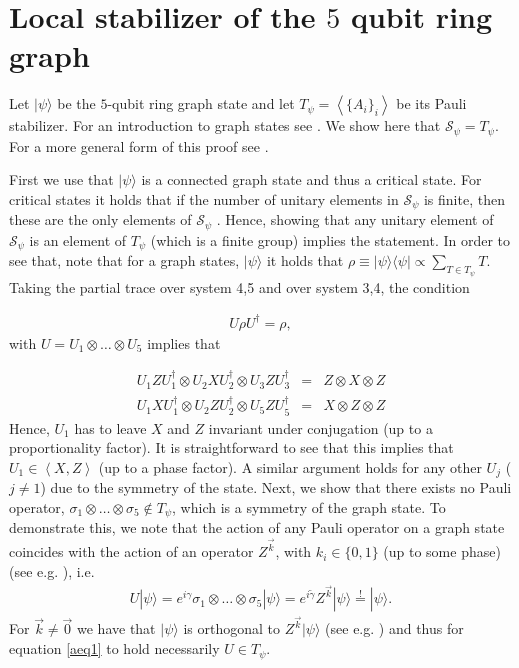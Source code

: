 \documentclass[superscriptaddress,twocolumn]{revtex4}\usepackage[utf8]{inputenc}
\newcommand{\bra}[1]{\langle #1|}
\newcommand{\ket}[1]{|#1\rangle}
\newcommand{\bea}{\begin{eqnarray}}
\newcommand{\eea}{\end{eqnarray}}
\begin{document}
\appendix

\section{Local stabilizer of the $5$ qubit ring graph\label{Appendix A}}

Let $\ket{\psi}$ be the $5$-qubit ring graph state and let $T_\psi=\left<\{A_i\}_i\right>$ be its Pauli stabilizer. For an introduction to graph states see \cite{HeDu06}. We show here that $\mathcal{S}_\psi=T_\psi$. For a more general form of this proof see \cite{RaDa18}.

First we use that $\ket{\psi}$ is a connected graph state and thus a critical state. For critical states it holds that if the number of unitary elements in  $\mathcal{S}_\psi$ is finite, then these are the only elements of $\mathcal{S}_\psi$ \cite{WaNo17}. Hence, showing that any unitary element of $\mathcal{S}_\psi$ is an element of $T_\psi$ (which is a finite group) implies the statement.
In order to see that, note that for a graph states, $\ket{\psi}$ it holds that  $\rho \equiv \ket{\psi}\bra{\psi}\propto\sum_{T\in T_{\psi}}T$. Taking the partial trace over system 4,5 and over system 3,4, the condition

\bea
U\rho U^\dagger=\rho,
\label{eq:sym}
\eea
with $U=U_1\otimes \ldots \otimes U_5$ implies that

\bea
U_1ZU_1^\dagger\otimes U_2XU_2^\dagger\otimes U_3ZU_3^\dagger&=&Z\otimes X\otimes Z\\
U_1XU_1^\dagger\otimes U_2ZU_2^\dagger\otimes U_5ZU_5^\dagger&=&X\otimes Z\otimes Z
\eea
Hence, $U_1$ has to leave $X$ and $Z$ invariant under conjugation (up to a proportionality factor). It is straightforward to see that this implies that $U_1\in \left<X,Z\right>$ (up to a phase factor). A similar argument holds for any other $U_j$ ($j\neq 1$) due to the symmetry of the state. Next, we show that there exists no Pauli operator, $\sigma_1\otimes \ldots\otimes \sigma_5 \notin T_\psi$, which is a symmetry of the graph state. To demonstrate this, we note that the action of any Pauli operator on a graph state coincides with the action of an operator $Z^{\vec{k}}$, with $k_i\in \{0,1\}$  (up to some phase) (see e.g. \cite{HeDu06}), i.e.
\bea
U\ket{\psi}=e^{i\gamma}\sigma_1\otimes \ldots\otimes \sigma_5 \ket{\psi}=e^{i\tilde{\gamma}}Z^{\vec{k}}\ket{\psi}\overset{!}{=} \ket{\psi}.\label{aeq1}
\eea
For $\vec{k} \neq \vec{0}$ we have that $\ket{\psi}$ is orthogonal to $Z^{\vec{k}}\ket{\psi}$ (see e.g. \cite{HeDu06}) and thus for equation \ref{aeq1} to hold necessarily $U\in T_\psi$.
\end{document}
